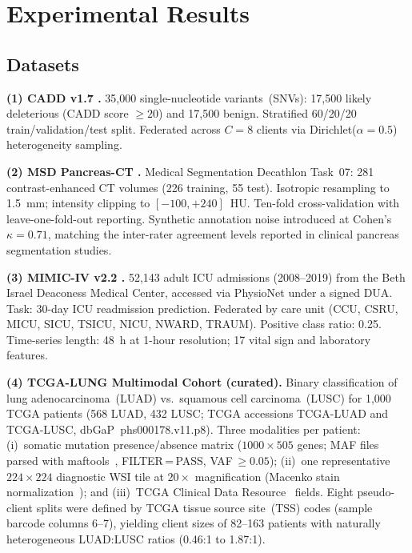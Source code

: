 \documentclass[a4paper,fleqn]{cas-dc}
\begin{document}
\section{Experimental Results}
\label{sec:experiments}

\subsection{Datasets}

\textbf{(1) CADD v1.7 \citep{rentzsch2019cadd}.}
35,000 single-nucleotide variants~(SNVs): 17,500 likely deleterious
(CADD score $\geq\!20$) and 17,500 benign. Stratified 60/20/20
train/validation/test split. Federated across $C\!=\!8$ clients via
Dirichlet($\alpha\!=\!0.5$) heterogeneity sampling.

\textbf{(2) MSD Pancreas-CT \citep{simpson2019msd}.}
Medical Segmentation Decathlon Task~07: 281 contrast-enhanced CT volumes
(226 training, 55 test). Isotropic resampling to 1.5~mm; intensity clipping to
$[-100,+240]$~HU. Ten-fold cross-validation with leave-one-fold-out reporting.
Synthetic annotation noise introduced at Cohen's $\kappa\!=\!0.71$, matching
the inter-rater agreement levels reported in clinical pancreas segmentation
studies.

\textbf{(3) MIMIC-IV v2.2 \citep{johnson2023mimiciv}.}
52,143 adult ICU admissions (2008--2019) from the Beth Israel Deaconess Medical
Center, accessed via PhysioNet under a signed DUA. Task: 30-day ICU
readmission prediction. Federated by care unit (CCU, CSRU, MICU, SICU, TSICU,
NICU, NWARD, TRAUM). Positive class ratio: 0.25. Time-series length: 48~h at
1-hour resolution; 17 vital sign and laboratory features.

\textbf{(4) TCGA-LUNG Multimodal Cohort (curated).}
Binary classification of lung adenocarcinoma~(LUAD) vs.\ squamous cell
carcinoma~(LUSC) for 1,000 TCGA patients (568 LUAD, 432 LUSC; TCGA accessions
TCGA-LUAD and TCGA-LUSC, dbGaP~phs000178.v11.p8). Three modalities per
patient: (i)~somatic mutation presence/absence matrix ($1000\!\times\!505$
genes; MAF files parsed with maftools~\citep{mayakonda2018maftools},
FILTER\,=\,PASS, VAF\,$\geq\!0.05$); (ii)~one representative $224\!\times\!224$
diagnostic WSI tile at $20\times$ magnification
(Macenko stain normalization~\citep{macenko2009}); and
(iii)~TCGA Clinical Data Resource~\citep{liu2018tcgacdr} fields.
Eight pseudo-client splits were defined by TCGA tissue source site~(TSS) codes
(sample barcode columns 6--7), yielding client sizes of 82--163 patients with
naturally heterogeneous LUAD:LUSC ratios (0.46:1 to 1.87:1).
\end{document}
